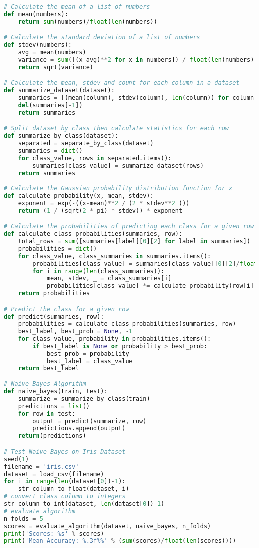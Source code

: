 \documentclass[12pt]{article}
\begin{document}
\begin{lstlisting}[language=python]
# Calculate the mean of a list of numbers
def mean(numbers):
	return sum(numbers)/float(len(numbers))

# Calculate the standard deviation of a list of numbers
def stdev(numbers):
	avg = mean(numbers)
	variance = sum([(x-avg)**2 for x in numbers]) / float(len(numbers)-1)
	return sqrt(variance)

# Calculate the mean, stdev and count for each column in a dataset
def summarize_dataset(dataset):
	summaries = [(mean(column), stdev(column), len(column)) for column in zip(*dataset)]
	del(summaries[-1])
	return summaries

# Split dataset by class then calculate statistics for each row
def summarize_by_class(dataset):
	separated = separate_by_class(dataset)
	summaries = dict()
	for class_value, rows in separated.items():
		summaries[class_value] = summarize_dataset(rows)
	return summaries

# Calculate the Gaussian probability distribution function for x
def calculate_probability(x, mean, stdev):
	exponent = exp(-((x-mean)**2 / (2 * stdev**2 )))
	return (1 / (sqrt(2 * pi) * stdev)) * exponent

# Calculate the probabilities of predicting each class for a given row
def calculate_class_probabilities(summaries, row):
	total_rows = sum([summaries[label][0][2] for label in summaries])
	probabilities = dict()
	for class_value, class_summaries in summaries.items():
		probabilities[class_value] = summaries[class_value][0][2]/float(total_rows)
		for i in range(len(class_summaries)):
			mean, stdev, _ = class_summaries[i]
			probabilities[class_value] *= calculate_probability(row[i], mean, stdev)
	return probabilities

# Predict the class for a given row
def predict(summaries, row):
	probabilities = calculate_class_probabilities(summaries, row)
	best_label, best_prob = None, -1
	for class_value, probability in probabilities.items():
		if best_label is None or probability > best_prob:
			best_prob = probability
			best_label = class_value
	return best_label

# Naive Bayes Algorithm
def naive_bayes(train, test):
	summarize = summarize_by_class(train)
	predictions = list()
	for row in test:
		output = predict(summarize, row)
		predictions.append(output)
	return(predictions)

# Test Naive Bayes on Iris Dataset
seed(1)
filename = 'iris.csv'
dataset = load_csv(filename)
for i in range(len(dataset[0])-1):
	str_column_to_float(dataset, i)
# convert class column to integers
str_column_to_int(dataset, len(dataset[0])-1)
# evaluate algorithm
n_folds = 5
scores = evaluate_algorithm(dataset, naive_bayes, n_folds)
print('Scores: %s' % scores)
print('Mean Accuracy: %.3f%%' % (sum(scores)/float(len(scores))))

\end{lstlisting}
\end{document}
